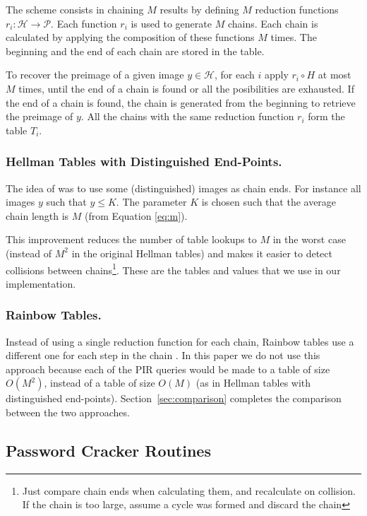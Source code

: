 \documentclass{llncs}
\def \CalH {\mathcal{H}}
\def \CalP {\mathcal{P}}
\begin{document}
The scheme consists in chaining $M$ results by defining $M$
reduction functions $r_{i} : \CalH \rightarrow \CalP$.
Each function $r_{i}$ is used to generate
$M$ chains. Each chain is calculated by applying the composition
of these functions $M$ times. The beginning and the end of
each chain are stored in the table.

To recover the preimage of a given image $y \in \CalH$,
for each $i$ apply $r_{i}\circ H$ at most $M$ times,
until the end of a chain is found or all the posibilities are exhausted. 
If the end of a chain
is found, the chain is generated from the beginning to retrieve the
preimage of $y$.
All the chains with the same reduction function $r_{i}$ form the
table $T_{i}$.


\subsubsection{Hellman Tables with Distinguished End-Points.}
\label{sub:distinguished end-points}

The idea of \cite{inbook:r-82} was
to use some (distinguished) images as chain ends. For instance all
images $y$ such that $y\leq K$. The parameter $K$ is chosen such that the average
chain length is $M$ (from Equation \ref{eq:m}). 

This improvement reduces the number of table lookups to $M$ in the
worst case (instead of $M^{2}$ in the original Hellman tables) and
makes it easier to detect collisions between chains\footnote{Just compare chain
ends when calculating them, and recalculate on collision. If the
chain is too large, assume a cycle was formed and discard the chain}.
These are the tables and values that we use in our implementation.


\subsubsection{Rainbow Tables.}

Instead of using a single reduction function for each chain, 
Rainbow tables use a different one for each step in the
chain \cite{paper:o-03}. In this paper we do not use this approach 
because each of the PIR queries would be made to a table of size $O(M^2)$,
instead of a table of size $O(M)$ 
(as in Hellman tables with distinguished end-points).
Section~\ref{sec:comparison} completes the comparison between the
two approaches.





\subsection{Password Cracker Routines}
\end{document}
